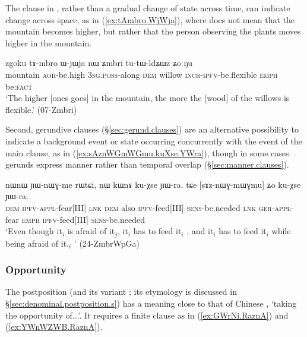 The clause in , rather than a gradual change of state across time, can indicate change across space, as in (\ref{ex:tAmbro.WjWja}), where  does not mean that the mountain becomes higher, but rather that the person observing the plants moves higher in the mountain.

\begin{exe}
\ex \label{ex:tAmbro.WjWja}
\gll  zgoku tɤ-mbro ɯ-jɯja nɯ ʑmbri tu-tɯ-ldʑɯz ʑo ŋu \\
mountain \textsc{aor}-be.high \textsc{3sg}.\textsc{poss}-along \textsc{dem} willow \textsc{incr}\redp{}-\textsc{ipfv}-be.flexible \textsc{emph} be:\textsc{fact} \\
\glt `The higher [ones goes] in the mountain, the more the [wood] of the willows is flexible.' (07-Zmbri)
\end{exe}

Second, gerundive clauses (§\ref{sec:gerund.clauses}) are an alternative possibility to indicate a background event or state occurring concurrently with the event of the main clause, as in (\ref{ex:sAznWGmWGmu.kuXse.YWra}), though in some cases gerunds express manner rather than temporal overlap (§\ref{sec:manner.clauses}).
 
\begin{exe}
\ex \label{ex:sAznWGmWGmu.kuXse.YWra}
\gll nɯnɯ ɲɯ-nɯɣ-me rɯtɕi, nɯ kɯnɤ ku-χse ɲɯ-ra.  tɕe [sɤz-nɯɣ-mɯ\redp{}ɣmu] ʑo ku-χse ɲɯ-ra. \\
\textsc{dem} \textsc{ipfv}-\textsc{appl}-fear[III] \textsc{lnk} \textsc{dem} also \textsc{ipfv}-feed[III] \textsc{sens}-be.needed \textsc{lnk} \textsc{ger}-\textsc{appl}-fear \textsc{emph} \textsc{ipfv}-feed[III]  \textsc{sens}-be.needed \\
\glt `Even though it$_i$ is afraid of it$_j$, it$_i$ has to feed it$_i$ , and it$_i$ has to feed it$_i$  while being afraid of it.$_i$ '  (24-ZmbrWpGa) 
\end{exe}

 

\subsubsection{Opportunity} \label{sec:RaznA}
The postposition  (and its variant ; its etymology is discussed in §\ref{sec:denominal.postposition.s}) has a meaning close to that of Chinese , `taking the opportunity of...'. It requires a finite clause as in (\ref{ex:GWrNi.RaznA}) and (\ref{ex:YWnWZWB.RaznA}).

